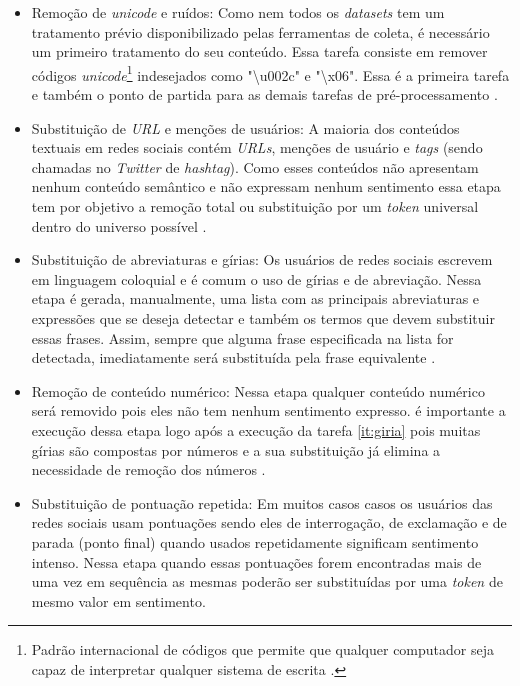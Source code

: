 \begin{itemize}
\item Remoção de \textit{unicode} e ruídos: Como nem todos os \textit{datasets} tem um tratamento prévio disponibilizado pelas ferramentas de coleta, é necessário um primeiro tratamento do seu conteúdo. Essa tarefa consiste em remover códigos \textit{unicode}\footnote{ Padrão internacional de códigos que permite que qualquer computador seja capaz de interpretar qualquer sistema de escrita \cite{0321480910}.} indesejados   como "\textbackslash u002c" e "\textbackslash x06". Essa é a primeira tarefa e também o ponto de partida para as demais tarefas de pré-processamento \cite{SYMEONIDIS2018298}.

\item Substituição de \textit{URL} e menções de usuários: A maioria dos conteúdos textuais em redes sociais contém \textit{URLs}, menções de usuário e \textit{tags} (sendo chamadas no \textit{Twitter} de \textit{hashtag}). Como esses conteúdos não apresentam nenhum conteúdo semântico e não expressam nenhum sentimento essa etapa tem por objetivo a remoção total ou substituição por um \textit{token} universal dentro do universo possível \cite{Khan2014}.
\label{it:giria}

\item Substituição de abreviaturas e gírias: Os usuários de redes sociais escrevem em linguagem coloquial e é comum o uso de gírias e de abreviação. Nessa etapa é gerada, manualmente, uma lista com as principais abreviaturas e expressões que se deseja detectar e também os termos que devem substituir essas frases. Assim, sempre que alguma frase especificada na lista for detectada, imediatamente será substituída pela frase equivalente \cite{Kouloumpis}.

\item Remoção de conteúdo numérico: Nessa etapa qualquer conteúdo numérico será removido pois eles não tem nenhum sentimento expresso. é importante a execução dessa etapa logo após a execução da tarefa \ref{it:giria} pois muitas gírias são compostas por números e a sua substituição já elimina a necessidade de remoção dos números \cite{He:2011:AEP:2002472.2002489}.

\item Substituição de pontuação repetida: Em muitos casos casos os usuários das redes sociais usam pontuações sendo eles de interrogação, de exclamação e de parada (ponto final) quando usados repetidamente significam sentimento intenso. Nessa etapa quando essas pontuações forem encontradas mais de uma vez em sequência as mesmas poderão ser substituídas por uma \textit{token} de mesmo valor em sentimento.


\end{itemize}
